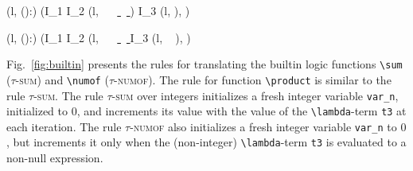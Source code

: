 \begin{figure*}[bt]
\scriptsize{
{
  {
    \splitfrac
        {(l, ():)
          }
        {
          (I_1 \concat I_2
          \concat
          (l, \underline{\Zinit {}} \semicolon\
          \underline{\Zinit {} \Zclear}\semicolon\
          \underline{ \Zclear}\semicolon\
          \underline{ \Zclear}
          \mathtt{)} \bopen )
          \concat I_3
          \concat
          (l,
          \underline{ \Zclear}\semicolon
          \bclose
          ),
          \mathtt{var_n})
        }
  }
}

{
  {
    \splitfrac
        {(l, ():)
          }
        {
          (I_1 \concat I_2
          \concat
          (l,
          \underline{\Zinit {}}
          \semicolon\
          \underline{\Zinit {} \Zclear}
          \semicolon\
          \underline{ \Zclear}
          \semicolon\
          \underline{ \Zclear}
          \mathtt{)} \bopen
          \concat I_3
          \concat (l,
          \mathtt{if(e3)}\
          \underline{}
          \semicolon
          \bclose
          ),
          )
        }
  }
}
}
\vspace{-2mm}
\caption{Translation rules for builtin logic functions}
\label{fig:builtin}
\vspace{-3mm}
\end{figure*}


Fig.~\ref{fig:builtin} presents the rules for translating the builtin
logic functions \lstinline|\sum| (\textsc{$\tau$-sum}) and \lstinline|\numof|
(\textsc{$\tau$-numof}). %
The rule for function %
\lstinline|\product| is similar 
to the rule %
\textsc{$\tau$-sum}.
The rule \textsc{$\tau$-sum} over integers initializes a fresh integer variable
\lstinline|var_n|, initialized to $0$, and increments its value with the value
of the \lstinline|\lambda|-term \lstinline't3' at each iteration.
The rule \textsc{$\tau$-numof} also initializes a fresh integer variable
\lstinline|var_n| to $0$, but increments it only when the (non-integer)
\lstinline|\lambda|-term \lstinline't3' is evaluated to a non-null expression.



